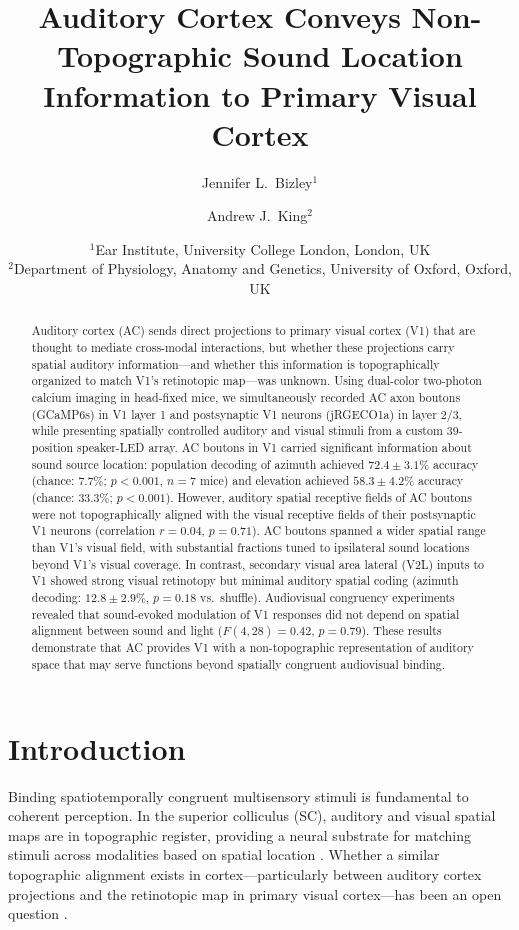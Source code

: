 \documentclass[11pt]{article}
\title{Auditory Cortex Conveys Non-Topographic Sound Location Information to Primary Visual Cortex}
\author{
  Jennifer L.\ Bizley$^{1}$ \and
  Andrew J.\ King$^{2}$
}
\date{
  $^{1}$Ear Institute, University College London, London, UK \\
  $^{2}$Department of Physiology, Anatomy and Genetics, University of Oxford, Oxford, UK
}
\begin{document}
\maketitle

\begin{abstract}
Auditory cortex (AC) sends direct projections to primary visual cortex (V1) that are thought to mediate cross-modal interactions, but whether these projections carry spatial auditory information---and whether this information is topographically organized to match V1's retinotopic map---was unknown. Using dual-color two-photon calcium imaging in head-fixed mice, we simultaneously recorded AC axon boutons (GCaMP6s) in V1 layer 1 and postsynaptic V1 neurons (jRGECO1a) in layer 2/3, while presenting spatially controlled auditory and visual stimuli from a custom 39-position speaker-LED array. AC boutons in V1 carried significant information about sound source location: population decoding of azimuth achieved $72.4 \pm 3.1$\% accuracy (chance: $7.7$\%; $p < 0.001$, $n = 7$ mice) and elevation achieved $58.3 \pm 4.2$\% accuracy (chance: $33.3$\%; $p < 0.001$). However, auditory spatial receptive fields of AC boutons were not topographically aligned with the visual receptive fields of their postsynaptic V1 neurons (correlation $r = 0.04$, $p = 0.71$). AC boutons spanned a wider spatial range than V1's visual field, with substantial fractions tuned to ipsilateral sound locations beyond V1's visual coverage. In contrast, secondary visual area lateral (V2L) inputs to V1 showed strong visual retinotopy but minimal auditory spatial coding (azimuth decoding: $12.8 \pm 2.9$\%, $p = 0.18$ vs.\ shuffle). Audiovisual congruency experiments revealed that sound-evoked modulation of V1 responses did not depend on spatial alignment between sound and light ($F(4,28) = 0.42$, $p = 0.79$). These results demonstrate that AC provides V1 with a non-topographic representation of auditory space that may serve functions beyond spatially congruent audiovisual binding.
\end{abstract}

\section{Introduction}

Binding spatiotemporally congruent multisensory stimuli is fundamental to coherent perception. In the superior colliculus (SC), auditory and visual spatial maps are in topographic register, providing a neural substrate for matching stimuli across modalities based on spatial location \citep{wallace1996, meredith1987, stein2008}. Whether a similar topographic alignment exists in cortex---particularly between auditory cortex projections and the retinotopic map in primary visual cortex---has been an open question \citep{ghazanfar2006, scholl2021}.
\end{document}

